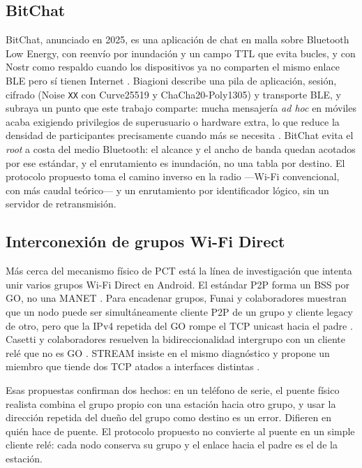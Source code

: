 \documentclass[12pt,oneside]{scrreprt}
\begin{document}
\subsection{BitChat}

BitChat, anunciado en 2025, es una aplicación de chat en malla sobre Bluetooth Low Energy, con reenvío por inundación y un campo TTL que evita bucles, y con Nostr como respaldo cuando los dispositivos ya no comparten el mismo enlace BLE pero sí tienen Internet \parencite{Biagioni2026}. Biagioni describe una pila de aplicación, sesión, cifrado (Noise \texttt{XX} con Curve25519 y ChaCha20-Poly1305) y transporte BLE, y subraya un punto que este trabajo comparte: mucha mensajería \emph{ad hoc} en móviles acaba exigiendo privilegios de superusuario o hardware extra, lo que reduce la densidad de participantes precisamente cuando más se necesita \parencite{Biagioni2026}. BitChat evita el \emph{root} a costa del medio Bluetooth: el alcance y el ancho de banda quedan acotados por ese estándar, y el enrutamiento es inundación, no una tabla por destino. El protocolo propuesto toma el camino inverso en la radio ---Wi-Fi convencional, con más caudal teórico--- y un enrutamiento por identificador lógico, sin un servidor de retransmisión.

\subsection{Interconexión de grupos Wi-Fi Direct}

Más cerca del mecanismo físico de PCT está la línea de investigación que intenta unir varios grupos Wi-Fi Direct en Android. El estándar P2P forma un BSS por GO, no una MANET \parencite{WiFiAlliance2010,CampsMur2013}. Para encadenar grupos, Funai y colaboradores muestran que un nodo puede ser simultáneamente cliente P2P de un grupo y cliente legacy de otro, pero que la IPv4 repetida del GO rompe el TCP unicast hacia el padre \parencite{Funai2017}. Casetti y colaboradores resuelven la bidireccionalidad intergrupo con un cliente relé que no es GO \parencite{Casetti2015}. STREAM insiste en el mismo diagnóstico y propone un miembro que tiende dos TCP atados a interfaces distintas \parencite{Dao2024}.

Esas propuestas confirman dos hechos: en un teléfono de serie, el puente físico realista combina el grupo propio con una estación hacia otro grupo, y usar la dirección repetida del dueño del grupo como destino es un error. Difieren en quién hace de puente. El protocolo propuesto no convierte al puente en un simple cliente relé: cada nodo conserva su grupo y el enlace hacia el padre es el de la estación.
\end{document}
